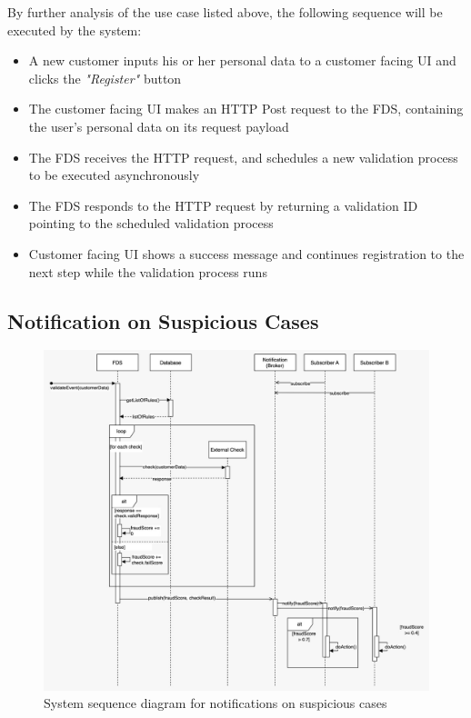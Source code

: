 By further analysis of the use case listed above, the following sequence will be executed by the system:
\begin{itemize}
 \item A new customer inputs his or her personal data to a customer facing UI and clicks the \emph{"Register"} button
 \item The customer facing UI makes an HTTP Post request to the FDS, containing the user's personal data on its request payload
 \item The FDS receives the HTTP request, and schedules a new validation process to be executed asynchronously
 \item The FDS responds to the HTTP request by returning a validation ID pointing to the scheduled validation process
 \item Customer facing UI shows a success message and continues registration to the next step while the validation process runs 
\end{itemize}

\subsection{Notification on Suspicious Cases}

\begin{figure}[!h]
 \includegraphics[width=\textwidth]{diagrams/sequence_notification.jpeg}
 \caption{System sequence diagram for notifications on suspicious cases}
\end{figure}

